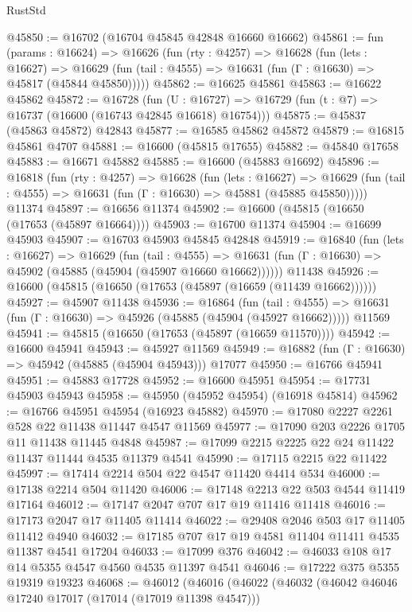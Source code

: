 \begin{lexlean}{RustStd}
\begin{coremodule}
@45850 := @16702 (@16704 @45845 @42848 @16660 @16662)
@45861 := fun (params : @16624) =>
  @16626
    (fun (rty : @4257) =>
    @16628
      (fun (lets : @16627) =>
      @16629 (fun (tail : @4555) => @16631 (fun (Γ : @16630) => @45817 (@45844 @45850)))))
@45862 := @16625 @45861
@45863 := @16622 @45862
@45872 := @16728
    (fun (U : @16727) => @16729 (fun (t : @7) => @16737 (@16600 (@16743 @42845 @16618) @16754)))
@45875 := @45837 (@45863 @45872) @42843
@45877 := @16585 @45862 @45872
@45879 := @16815 @45861 @4707
@45881 := @16600 (@45815 @17655)
@45882 := @45840 @17658
@45883 := @16671 @45882
@45885 := @16600 (@45883 @16692)
@45896 := @16818
    (fun (rty : @4257) =>
    @16628
      (fun (lets : @16627) =>
      @16629 (fun (tail : @4555) => @16631 (fun (Γ : @16630) => @45881 (@45885 @45850)))))
    @11374
@45897 := @16656 @11374
@45902 := @16600 (@45815 (@16650 (@17653 (@45897 @16664))))
@45903 := @16700 @11374
@45904 := @16699 @45903
@45907 := @16703 @45903 @45845 @42848
@45919 := @16840
    (fun (lets : @16627) =>
    @16629
      (fun (tail : @4555) =>
      @16631 (fun (Γ : @16630) => @45902 (@45885 (@45904 (@45907 @16660 @16662))))))
    @11438
@45926 := @16600 (@45815 (@16650 (@17653 (@45897 (@16659 (@11439 @16662))))))
@45927 := @45907 @11438
@45936 := @16864
    (fun (tail : @4555) => @16631 (fun (Γ : @16630) => @45926 (@45885 (@45904 (@45927 @16662)))))
    @11569
@45941 := @45815 (@16650 (@17653 (@45897 (@16659 @11570))))
@45942 := @16600 @45941
@45943 := @45927 @11569
@45949 := @16882 (fun (Γ : @16630) => @45942 (@45885 (@45904 @45943))) @17077
@45950 := @16766 @45941
@45951 := @45883 @17728
@45952 := @16600 @45951
@45954 := @17731 @45903 @45943
@45958 := @45950 (@45952 @45954) (@16918 @45814)
@45962 := @16766 @45951 @45954 (@16923 @45882)
@45970 := @17080 @2227 @2261 @528 @22 @11438 @11447 @4547 @11569
@45977 := @17090 @203 @2226 @1705 @11 @11438 @11445 @4848
@45987 := @17099 @2215 @2225 @22 @24 @11422 @11437 @11444 @4535 @11379 @4541
@45990 := @17115 @2215 @22 @11422
@45997 := @17414 @2214 @504 @22 @4547 @11420 @4414 @534
@46000 := @17138 @2214 @504 @11420
@46006 := @17148 @2213 @22 @503 @4544 @11419 @17164
@46012 := @17147 @2047 @707 @17 @19 @11416 @11418
@46016 := @17173 @2047 @17 @11405 @11414
@46022 := @29408 @2046 @503 @17 @11405 @11412 @4940
@46032 := @17185 @707 @17 @19 @4581 @11404 @11411 @4535 @11387 @4541 @17204
@46033 := @17099 @376
@46042 := @46033 @108 @17 @14 @5355 @4547 @4560 @4535 @11397 @4541
@46046 := @17222 @375 @5355 @19319 @19323
@46068 := @46012
    (@46016
      (@46022
        (@46032
          (@46042 @46046 @17240 @17017 (@17014 (@17019 @11398 @4547)))

\end{coremodule}
\end{lexlean}
